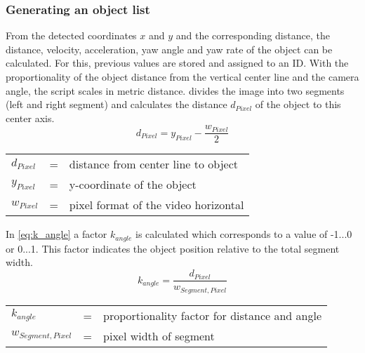 \subsubsection{Generating an object list}
From the detected coordinates $x$ and $y$ and the corresponding distance, the distance, velocity, acceleration, yaw angle and yaw rate of the object can be calculated. For this, previous values are stored and assigned to an \ac{ID}. With the proportionality of the object distance from the vertical center line and the camera angle, the script scales in metric distance.
 divides the image into two segments (left and right segment) and calculates the distance $d_{Pixel}$ of the object to this center axis.
\begin{equation}
		d_{Pixel} = y_{Pixel} - \frac{w_{Pixel}}{2}
		\label{eq:d_Pixel}
\end{equation}
\begin{table}[!h]
	\begin{center}
		\begin{tabular}{l c l}
			$d_{Pixel}$ & = & distance from center line to object\\
			$y_{Pixel}$ & = &  y-coordinate of the object\\
			$w_{Pixel}$ & = & pixel format of the video horizontal\\
		\end{tabular}
	\end{center}
\end{table}


In \cref{eq:k_angle} a factor $k_{angle}$ is calculated which corresponds to a value of -1...0 or 0...1. This factor indicates the object position relative to the total segment width.
\begin{equation}
k_{angle}  = \frac{d_{Pixel}}{w_{Segment,Pixel}}
\label{eq:k_angle}
\end{equation}
\begin{table}[!h]
	\begin{center}
		\begin{tabular}{l c l}
			$k_{angle}$ & = & proportionality factor for distance and angle\\
			$w_{Segment,Pixel}$ & = &  pixel width of segment\\
		\end{tabular}
	\end{center}
\end{table}


